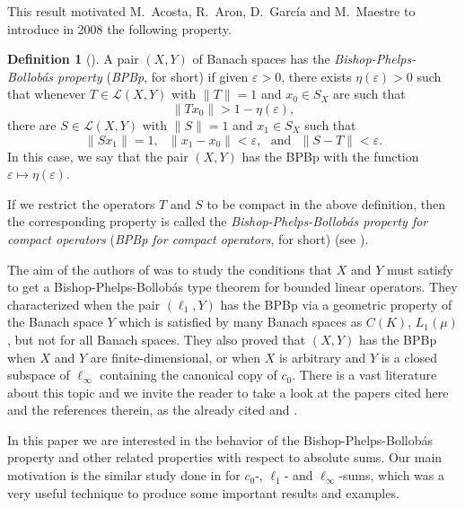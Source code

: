 \documentclass[10pt,a4paper]{amsart}
\theoremstyle{plain}
\theoremstyle{definition}
\newtheorem{definition}[theorem]{Definition}
\newcommand{\eps}{\varepsilon}
\begin{document}
This result motivated M.~Acosta, R.~Aron, D.~Garc\'ia and M.~Maestre \cite{AAGM} to introduce in 2008 the following property.

\begin{definition}[\mbox{\cite[Definition 1.1]{AAGM}}]
A pair $(X, Y)$ of Banach spaces has the {\it Bishop-Phelps-Bollob\'as property} ({\it BPBp}, for short) if given $\eps > 0$, there exists $\eta(\eps) > 0$ such that whenever $T \in \mathcal{L}(X, Y)$ with $\|T\| = 1$ and $x_0 \in S_X$ are such that
	\begin{equation*}
	\|Tx_0\| > 1 - \eta(\eps),
	\end{equation*}
	there are $S \in \mathcal{L}(X, Y)$ with $\|S\| = 1$ and $x_1 \in S_X$ such that
	\begin{equation*}
	\|Sx_1\| = 1, \ \ \ \|x_1 - x_0\| < \eps, \ \ \ \text{and} \ \ \ \|S - T\| < \eps.
	\end{equation*}
In this case, we say that the pair $(X, Y)$ has the BPBp with the function $\eps \longmapsto \eta(\eps)$.

If we restrict the operators $T$ and $S$ to be compact in the above definition, then the corresponding property is called the {\it Bishop-Phelps-Bollob\'{a}s property for compact operators} ({\it BPBp for compact operators}, for short) (see \cite{DGMM}).
\end{definition}

The aim of the authors of \cite{AAGM} was to study the conditions that $X$ and $Y$ must satisfy to get a Bishop-Phelps-Bollob\'as type theorem for bounded linear operators. They characterized when the pair $(\ell_1,Y)$ has the BPBp via a geometric property of the Banach space $Y$ which is satisfied by many Banach spaces as $C(K)$, $L_1(\mu)$, but not for all Banach spaces. They also proved that $(X, Y)$ has the BPBp when $X$ and $Y$ are finite-dimensional, or when $X$ is arbitrary and $Y$ is a closed subspace of $\ell_\infty$ containing the canonical copy of $c_0$. There is a vast literature about this topic and we invite the reader to take a look at the papers cited here and the references therein, as the already cited \cite{AAGM} and \cite{AMS, ACKLM,Cho-Choi,DGMM,DKL,DKKLM,KimLeeMartin-JMAA2015}.

In this paper we are interested in the behavior of the Bishop-Phelps-Bollob\'as property and other related properties with respect to absolute sums. Our main motivation is the similar study done in \cite{ACKLM} for $c_0$-, $\ell_1$- and $\ell_\infty$-sums, which was a very useful technique to produce some important results and examples.
\end{document}
